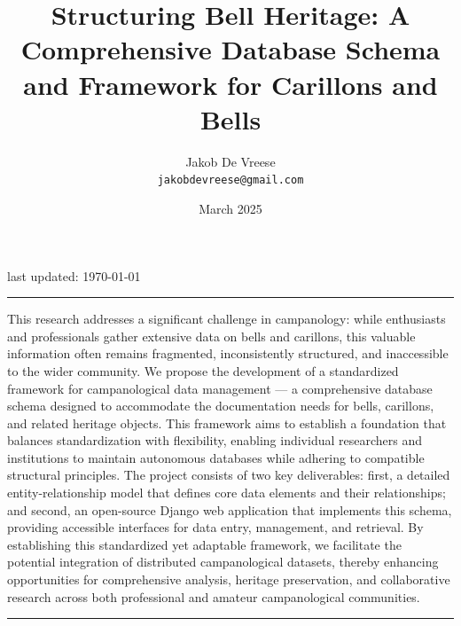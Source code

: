 \documentclass[11pt, a4paper]{article}
\title{\Huge Structuring Bell Heritage: A Comprehensive Database Schema and Framework for Carillons and Bells}
\author{\LARGE{Jakob De Vreese} \\ \texttt{\small{jakobdevreese@gmail.com}}}
\date{March 2025}
\newlength{\abstractwidth}
\begin{document}
\begin{titlepage}
    \maketitle
    \thispagestyle{empty}
    \vspace{1cm}
    \begin{center}
        \small{last updated: \today}
    \end{center}
    \vspace{2cm}
    
    \begin{center}
        \rule{\textwidth}{0.4pt}
        \vspace{1em}
        
        \begin{minipage}{\abstractwidth}
            \setlength{\rightskip}{0pt plus 1fil} %
            \justifying
            \noindent
            This research addresses a significant challenge in campanology: while enthusiasts and professionals 
            gather extensive data on bells and carillons, this valuable information often remains fragmented, 
            inconsistently structured, and inaccessible to the wider community. We propose the development of a 
            standardized framework for campanological data management — a comprehensive database schema designed 
            to accommodate the documentation needs for bells, carillons, and related heritage objects. This framework 
            aims to establish a foundation that balances standardization with flexibility, enabling individual 
            researchers and institutions to maintain autonomous databases while adhering to compatible structural 
            principles. The project consists of two key deliverables: first, a detailed entity-relationship model 
            that defines core data elements and their relationships; and second, an open-source Django web application 
            that implements this schema, providing accessible interfaces for data entry, management, and retrieval. 
            By establishing this standardized yet adaptable framework, we facilitate the potential integration of 
            distributed campanological datasets, thereby enhancing opportunities for comprehensive analysis, heritage 
            preservation, and collaborative research across both professional and amateur campanological communities.
          \end{minipage}
        
        \vspace{1em}
        \rule{\textwidth}{0.4pt}
    \end{center}

    \restoregeometry
\end{titlepage}
\end{document}
